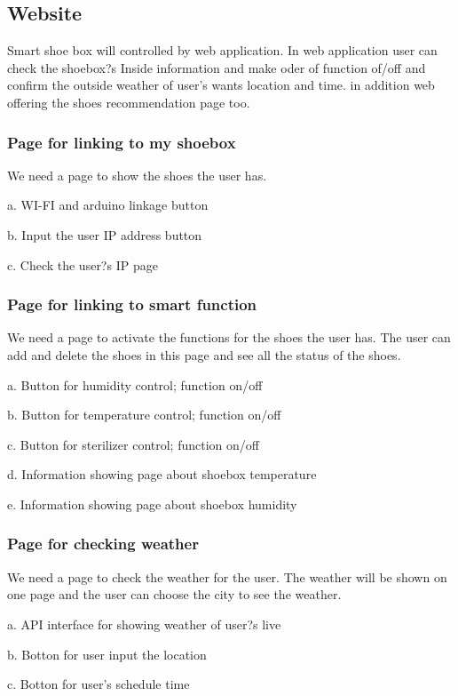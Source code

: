 \documentclass[conference]{IEEEtran}
\begin{document}
\subsection{Website}
 Smart shoe box will controlled by web application. In web application user can
check the shoebox?s Inside information and make oder of function of/off and
confirm the outside weather of user's wants location and time. in addition web 
offering the shoes recommendation page too.\\
\subsubsection{Page for linking to my shoebox}We need a page to show the shoes the user has.

a. WI-FI and arduino linkage button

b. Input the user IP address button

c. Check the user?s IP page\\

\subsubsection{Page for linking to smart function}We need a page to activate the functions for the shoes the user has. The user can add and delete the shoes in this page and see all the status of the shoes.

a. Button for humidity control; function on/off 

b. Button for temperature control; function on/off 

c. Button for sterilizer control; function on/off 

d. Information showing page about shoebox temperature 

e. Information showing page about shoebox humidity\\

\subsubsection{Page for checking weather}We need a page to check the weather for the user. The weather will be shown on one page and the user can choose the city to see the weather.

a. API interface for showing weather of user?s live

b. Botton for user input the location

c. Botton for user's schedule time
\end{document}
